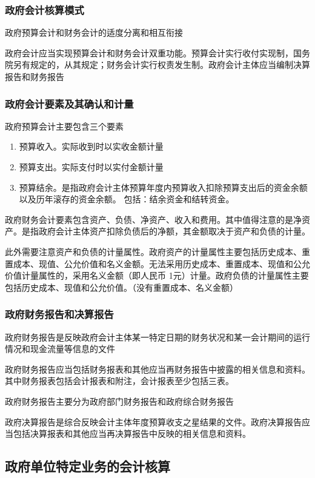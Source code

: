 \documentclass[UTF8,12pt]{ctexart}
\numberwithin{equation}{section} %
\numberwithin{figure}{section}
\numberwithin{table}{section}
\begin{document}
	\subsubsection{政府会计核算模式}
	政府预算会计和财务会计的适度分离和相互衔接
	
	政府会计应当实现预算会计和财务会计双重功能。预算会计实行收付实现制，国务院另有规定的，从其规定；财务会计实行权责发生制。政府会计主体应当编制决算报告和财务报告
	\subsubsection{政府会计要素及其确认和计量}
	政府预算会计主要包含三个要素
	\begin{enumerate}
		\item 预算收入。实际收到时以实收金额计量
		
		\item 预算支出。实际支付时以实付金额计量
		
		\item 预算结余。是指政府会计主体预算年度内预算收入扣除预算支出后的资金余额以及历年滚存的资金余额。
		包括：结余资金和结转资金。
	\end{enumerate}
	
	政府财务会计要素包含资产、负债、净资产、收入和费用。其中值得注意的是净资产。是指政府会计主体资产扣除负债后的净额，其金额取决于资产和负债的计量。
	
	此外需要注意资产和负债的计量属性。政府资产的计量属性主要包括历史成本、重置成本、现值、公允价值和名义金额。无法采用历史成本、重置成本、现值和公允价值计量属性的，采用名义金额（即人民币 1元）计量。政府负债的计量属性主要包括历史成本、现值和公允价值。（没有重置成本、名义金额）
	
	\subsubsection{政府财务报告和决算报告}
	政府财务报告是反映政府会计主体某一特定日期的财务状况和某一会计期间的运行情况和现金流量等信息的文件
	
	政府财务报告应当包括财务报表和其他应当再财务报告中披露的相关信息和资料。其中财务报表包括会计报表和附注，会计报表至少包括三表。
	
	政府财务报告主要分为政府部门财务报告和政府综合财务报告
	
	政府决算报告是综合反映会计主体年度预算收支之星结果的文件。政府决算报告应当包括决算报表和其他应当再决算报告中反映的相关信息和资料。
	
	\subsection{政府单位特定业务的会计核算}
\end{document}
